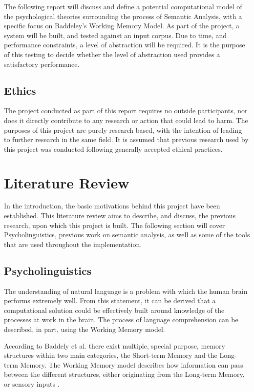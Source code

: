 \documentclass[]{article}
\begin{document}
The following report will discuss and define a potential computational model of the psychological theories surrounding the process of Semantic Analysis, with a specific focus on Baddeley's Working Memory Model. As part of the project, a system will be built, and tested against an input corpus. Due to time, and performance constraints, a level of abstraction will be required. It is the purpose of this testing to decide whether the level of abstraction used provides a satisfactory performance.

\subsection{Ethics}
\label{sec:IntroEthics}

The project conducted as part of this report requires no outside participants, nor does it directly contribute to any research or action that could lead to harm. The purposes of this project are purely research based, with the intention of leading to further research in the same field. It is assumed that previous research used by this project was conducted following generally accepted ethical practices.

\section{Literature Review}
\label{sec:LitReview}

In the introduction, the basic motivations behind this project have been established. This literature review aims to describe, and discuss, the previous research, upon which this project is built. The following section will cover Psycholinguistics, previous work on semantic analysis, as well as some of the tools that are used throughout the implementation.

\subsection{Psycholinguistics}
\label{sec:Psycholinguistics}
The understanding of natural language is a problem with which the human brain performs extremely well. From this statement, it can be derived that a computational solution could be effectively built around knowledge of the processes at work in the brain. The process of language comprehension can be described, in part, using the Working Memory model\cite{MemoryBaddeleyEysenkAnderson}.

According to Baddely et al. \cite{MemoryBaddeleyEysenkAnderson} there exist multiple, special purpose, memory structures within two main categories, the Short-term Memory and the Long-term Memory. The Working Memory model describes how information can pass between the different structures, either originating from the Long-term Memory, or sensory inputs \cite{MemoryBaddeleyEysenkAnderson}.
\end{document}
